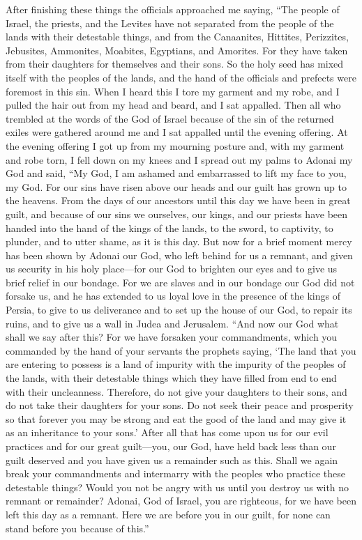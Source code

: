 \begin{biblechapter} %
 After finishing these things the officials approached me saying, “The people of Israel, the priests, and the Levites have not separated from the people of the lands with their detestable things, and from the Canaanites, Hittites, Perizzites, Jebusites, Ammonites, Moabites, Egyptians, and Amorites.
\verse For they have taken from their daughters for themselves and their sons. So the holy seed has mixed itself with the peoples of the lands, and the hand of the officials and prefects were foremost in this sin.
\verse When I heard this I tore my garment and my robe, and I pulled the hair out from my head and beard, and I sat appalled.
\verse Then all who trembled at the words of the God of Israel because of the sin of the returned exiles were gathered around me and I sat appalled until the evening offering.
 At the evening offering I got up from my mourning posture and, with my garment and robe torn, I fell down on my knees and I spread out my palms to Adonai my God
\verse and said, “My God, I am ashamed and embarrassed to lift my face to you, my God. For our sins have risen above our heads and our guilt has grown up to the heavens.
\verse From the days of our ancestors until this day we have been in great guilt, and because of our sins we ourselves, our kings, and our priests have been handed into the hand of the kings of the lands, to the sword, to captivity, to plunder, and to utter shame, as it is this day.
\verse But now for a brief moment mercy has been shown by Adonai our God, who left behind for us a remnant, and given us security in his holy place—for our God to brighten our eyes and to give us brief relief in our bondage.
\verse For we are slaves and in our bondage our God did not forsake us, and he has extended to us loyal love in the presence of the kings of Persia, to give to us deliverance and to set up the house of our God, to repair its ruins, and to give us a wall in Judea and Jerusalem.
\verse “And now our God what shall we say after this? For we have forsaken your commandments,
\verse which you commanded by the hand of your servants the prophets saying, ‘The land that you are entering to possess is a land of impurity with the impurity of the peoples of the lands, with their detestable things which they have filled from end to end with their uncleanness.
\verse Therefore, do not give your daughters to their sons, and do not take their daughters for your sons. Do not seek their peace and prosperity so that forever you may be strong and eat the good of the land and may give it as an inheritance to your sons.’
\verse After all that has come upon us for our evil practices and for our great guilt—you, our God, have held back less than our guilt deserved and you have given us a remainder such as this.
\verse Shall we again break your commandments and intermarry with the peoples who practice these detestable things? Would you not be angry with us until you destroy us with no remnant or remainder?
\verse Adonai, God of Israel, you are righteous, for we have been left this day as a remnant. Here we are before you in our guilt, for none can stand before you because of this.”
\end{biblechapter}

